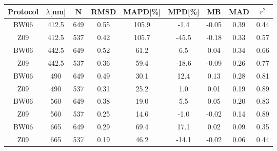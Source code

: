 \documentclass[preview]{standalone}
\begin{document}
\small

\begin{table}
\begin{tabular}{ccccccccc}

\hline
Protocol & $\lambda$[nm] & N & RMSD & MAPD[\%] & MPD[\%] & MB & MAD & $r^2$  \\\hline
 
BW06 & 412.5 & 649 & 0.55 & 105.9 & -1.4 & -0.05 & 0.39 & 0.44\\
Z09 & 412.5 & 537 & 0.42 & 105.7 & -45.5 & -0.18 & 0.33 & 0.57\\\hline

BW06 & 442.5 & 649 & 0.52 & 61.2 & 6.5 & 0.04 & 0.34 & 0.66\\
Z09 & 442.5 & 537 & 0.36 & 59.4 & -18.6 & -0.09 & 0.26 & 0.77\\\hline

BW06 & 490 & 649 & 0.49 & 30.1 & 12.4 & 0.13 & 0.28 & 0.81\\
Z09 & 490 & 537 & 0.31 & 25.2 & 1.0 & 0.01 & 0.19 & 0.89\\\hline

BW06 & 560 & 649 & 0.38 & 19.0 & 5.5 & 0.05 & 0.20 & 0.83\\
Z09 & 560 & 537 & 0.25 & 14.6 & -1.0 & -0.02 & 0.14 & 0.89\\\hline

BW06 & 665 & 649 & 0.29 & 69.4 & 17.1 & 0.02 & 0.09 & 0.35\\
Z09 & 665 & 537 & 0.19 & 46.2 & -14.1 & -0.02 & 0.06 & 0.44\\\hline


\end{tabular}
\end{table}
\end{document}
